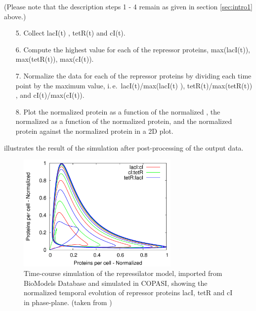 (Please note that the description steps 1 - 4 remain as given in section \ref{sec:intro1} above.)
\begin{enumerate}
\item[5.]{Collect lacI(t) , tetR(t) and cI(t).}
\item[6.]{Compute the highest value for each of the repressor proteins,  max(lacI(t)), max(tetR(t)), max(cI(t)).}
\item[7.]{Normalize the data for each of the repressor proteins by dividing each time point by the maximum value, i.\,e.\ lacI(t)/max(lacI(t) ), tetR(t)/max(tetR(t)) , and cI(t)/max(cI(t)).}
\item[8.]{Plot the normalized  protein as a function of the normalized , the normalized   as a function of the normalized  protein, and the normalized  protein against the normalized  protein in a 2D plot.}
\end{enumerate}
 illustrates the result of the simulation after post-processing of the output data. 
\begin{figure}
\centering
\includegraphics[width=0.7\textwidth]{images/simEx2.png}
\caption{Time-course simulation of the repressilator model, imported from BioModels Database and simulated in COPASI, showing the normalized temporal evolution of repressor proteins lacI, tetR and cI in phase-plane. (taken from \cite{Waltemath:2011})}
\label{fig:simEx2}
\end{figure}

